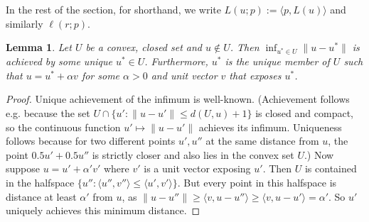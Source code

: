 \documentclass[11pt]{article}
\newtheorem{lemma}{Lemma}
\begin{document}
In the rest of the section, for shorthand, we write $L(u;p) := \langle p, L(u) \rangle$ and similarly $\ell(r;p)$.

\begin{lemma} \label{lemma:exposed-shortest}
  Let $U$ be a convex, closed set and $u \not\in U$.
  Then $\inf_{u^* \in U} \|u-u^*\|$ is achieved by some unique $u^* \in U$.
  Furthermore, $u^*$ is the unique member of $U$ such that $u = u^* + \alpha v$ for some $\alpha > 0$ and unit vector $v$ that exposes $u^*$.
\end{lemma}
\begin{proof}
  Unique achievement of the infimum is well-known.
  (Achievement follows e.g. because the set $U \cap \{u' : \|u - u'\| \leq d(U,u) + 1\}$ is closed and compact, so the continuous function $u' \mapsto \|u-u'\|$ achieves its infimum.
  Uniqueness follows because for two different points $u',u''$ at the same distance from $u$, the point $0.5u' + 0.5u''$ is strictly closer and also lies in the convex set $U$.)
  Now suppose $u = u' + \alpha' v'$ where $v'$ is a unit vector exposing $u'$.
  Then $U$ is contained in the halfspace $\{u'': \langle u'', v'' \rangle \leq \langle u',v' \rangle \}$.
  But every point in this halfspace is distance at least $\alpha'$ from $u$, as $\|u-u''\| \geq \langle v, u - u'' \rangle \geq \langle v, u-u'\rangle = \alpha'$.
  So $u'$ uniquely achieves this minimum distance.
\end{proof}
\end{document}
